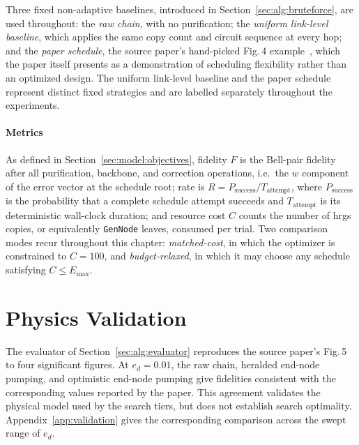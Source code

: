 Three fixed non-adaptive baselines, introduced in Section~\ref{sec:alg:bruteforce}, are used throughout: the \emph{raw chain}, with no purification; the \emph{uniform link-level baseline}, which applies the same copy count and circuit sequence at every hop; and the \emph{paper schedule}, the source paper's hand-picked Fig.\,4 example~\cite{Benchasattabuse2025Integrating}, which the paper itself presents as a demonstration of scheduling flexibility rather than an optimized design. The uniform link-level baseline and the paper schedule represent distinct fixed strategies and are labelled separately throughout the experiments.

\paragraph{Metrics}
\label{sec:exp:metrics}

As defined in Section~\ref{sec:model:objectives}, fidelity $F$ is the Bell-pair fidelity after all purification, backbone, and correction operations, i.e.\ the $w$ component of the error vector at the schedule root; rate is $R=P_{\mathrm{success}}/T_{\mathrm{attempt}}$, where $P_{\mathrm{success}}$ is the probability that a complete schedule attempt succeeds and $T_{\mathrm{attempt}}$ is its deterministic wall-clock duration; and resource cost $C$ counts the number of \Gls{hrgs} copies, or equivalently \texttt{GenNode} leaves, consumed per trial. Two comparison modes recur throughout this chapter: \emph{matched-cost}, in which the optimizer is constrained to $C=100$, and \emph{budget-relaxed}, in which it may choose any schedule satisfying $C\le E_{\max}$.

\section{Physics Validation}
\label{sec:exp:validation}


The evaluator of Section~\ref{sec:alg:evaluator} reproduces the source paper's Fig.\,5~\cite{Benchasattabuse2025Integrating} to four significant figures. At $e_d=0.01$, the raw chain, heralded end-node pumping, and optimistic end-node pumping give fidelities consistent with the corresponding values reported by the paper. This agreement validates the physical model used by the search tiers, but does not establish search optimality. Appendix~\ref{app:validation} gives the corresponding comparison across the swept range of $e_d$.

